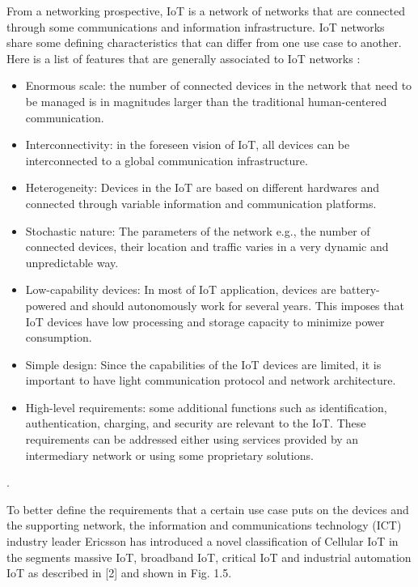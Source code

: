 \documentclass[conference]{IEEEtran}
\begin{document}
From a networking prospective, IoT is a network of networks that are connected through some communications and information infrastructure. IoT networks share some defining characteristics that can differ from one use case to another. Here is a list of features that are generally associated to IoT networks \cite{noauthor_y2060_nodate,3gpp_service_nodate_22.368}:
\begin{itemize}
    \item Enormous scale: the number of connected devices in the network that need to be managed is in magnitudes larger than the traditional human-centered communication.
    \item Interconnectivity: in the foreseen vision of IoT, all devices can be interconnected to a global communication infrastructure.
    \item Heterogeneity: Devices in the IoT are based on different hardwares and connected through variable information and communication platforms.
    \item Stochastic nature: The parameters of the network e.g., the number of connected devices, their location and traffic varies in a very dynamic and unpredictable way.
    \item Low-capability devices: In most of IoT application, devices are battery-powered and should autonomously work for several years. This imposes that IoT devices have low processing and storage capacity to minimize power consumption.
    \item Simple design: Since the capabilities of the IoT devices are limited, it is important to have light communication protocol and network architecture.
    \item High-level requirements: some additional functions such as identification, authentication, charging, and security are relevant to the IoT. These requirements can be addressed either using services provided by an intermediary network or using some proprietary solutions.
\end{itemize}.





To better deﬁne the requirements that a certain use case puts on the devices and the supporting network, the information and communications technology (ICT) industry leader Ericsson has introduced a novel classiﬁcation of Cellular IoT in the segments massive IoT, broadband IoT, critical IoT and industrial automation IoT as described in [2] and shown in Fig. 1.5.
\end{document}
